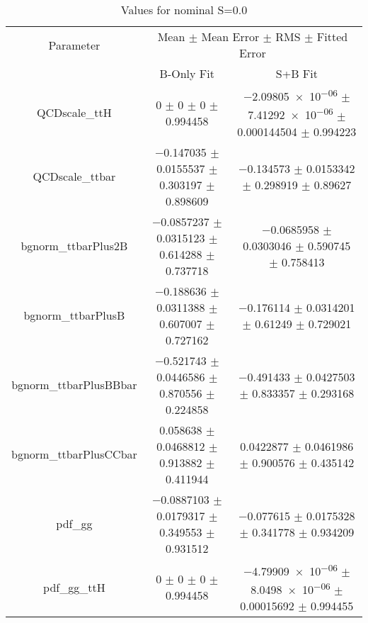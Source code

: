 \begin{table}
\centering
\caption{Values for nominal S=0.0}
\begin{tabular}{ccc}
\toprule
Parameter & \multicolumn{2}{c}{Mean $\pm$ Mean Error $\pm$ RMS $\pm$ Fitted Error}\\
 & B-Only Fit & S+B Fit\\
\midrule
QCDscale\_ttH & \num{0} $\pm$ \num{0} $\pm$ \num{0} $\pm$ \num{0.994458} & \num{-2.09805e-06} $\pm$ \num{7.41292e-06} $\pm$ \num{0.000144504} $\pm$ \num{0.994223}\\
QCDscale\_ttbar & \num{-0.147035} $\pm$ \num{0.0155537} $\pm$ \num{0.303197} $\pm$ \num{0.898609} & \num{-0.134573} $\pm$ \num{0.0153342} $\pm$ \num{0.298919} $\pm$ \num{0.89627}\\
bgnorm\_ttbarPlus2B & \num{-0.0857237} $\pm$ \num{0.0315123} $\pm$ \num{0.614288} $\pm$ \num{0.737718} & \num{-0.0685958} $\pm$ \num{0.0303046} $\pm$ \num{0.590745} $\pm$ \num{0.758413}\\
bgnorm\_ttbarPlusB & \num{-0.188636} $\pm$ \num{0.0311388} $\pm$ \num{0.607007} $\pm$ \num{0.727162} & \num{-0.176114} $\pm$ \num{0.0314201} $\pm$ \num{0.61249} $\pm$ \num{0.729021}\\
bgnorm\_ttbarPlusBBbar & \num{-0.521743} $\pm$ \num{0.0446586} $\pm$ \num{0.870556} $\pm$ \num{0.224858} & \num{-0.491433} $\pm$ \num{0.0427503} $\pm$ \num{0.833357} $\pm$ \num{0.293168}\\
bgnorm\_ttbarPlusCCbar & \num{0.058638} $\pm$ \num{0.0468812} $\pm$ \num{0.913882} $\pm$ \num{0.411944} & \num{0.0422877} $\pm$ \num{0.0461986} $\pm$ \num{0.900576} $\pm$ \num{0.435142}\\
pdf\_gg & \num{-0.0887103} $\pm$ \num{0.0179317} $\pm$ \num{0.349553} $\pm$ \num{0.931512} & \num{-0.077615} $\pm$ \num{0.0175328} $\pm$ \num{0.341778} $\pm$ \num{0.934209}\\
pdf\_gg\_ttH & \num{0} $\pm$ \num{0} $\pm$ \num{0} $\pm$ \num{0.994458} & \num{-4.79909e-06} $\pm$ \num{8.0498e-06} $\pm$ \num{0.00015692} $\pm$ \num{0.994455}\\
\bottomrule
\end{tabular}
\end{table}